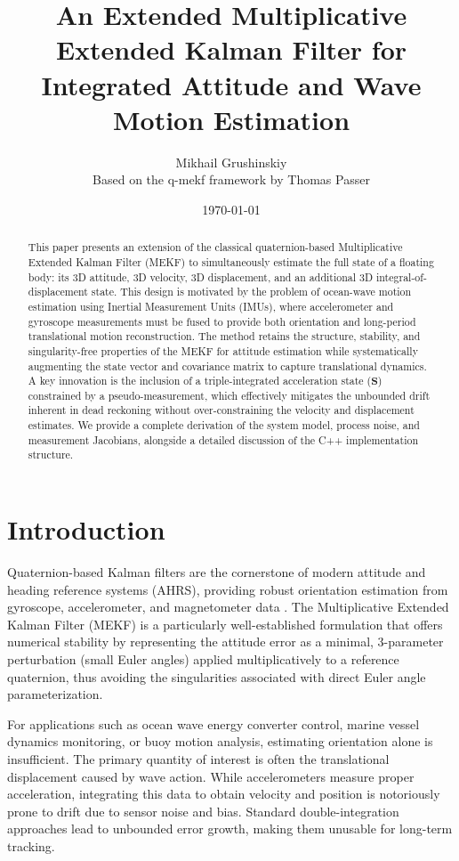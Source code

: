 \documentclass[11pt]{article}
\title{An Extended Multiplicative Extended Kalman Filter for Integrated Attitude and Wave Motion Estimation}
\author{Mikhail Grushinskiy \\ Based on the q-mekf framework by Thomas Passer}
\date{\today}
\begin{document}
\maketitle

\begin{abstract}
This paper presents an extension of the classical quaternion-based Multiplicative Extended Kalman Filter (MEKF) to simultaneously estimate the full state of a floating body: its 3D attitude, 3D velocity, 3D displacement, and an additional 3D integral-of-displacement state. This design is motivated by the problem of ocean-wave motion estimation using Inertial Measurement Units (IMUs), where accelerometer and gyroscope measurements must be fused to provide both orientation and long-period translational motion reconstruction. The method retains the structure, stability, and singularity-free properties of the MEKF for attitude estimation while systematically augmenting the state vector and covariance matrix to capture translational dynamics. A key innovation is the inclusion of a triple-integrated acceleration state ($\bm{S}$) constrained by a pseudo-measurement, which effectively mitigates the unbounded drift inherent in dead reckoning without over-constraining the velocity and displacement estimates. We provide a complete derivation of the system model, process noise, and measurement Jacobians, alongside a detailed discussion of the C++ implementation structure.
\end{abstract}

\section{Introduction}
\label{sec:introduction}
Quaternion-based Kalman filters are the cornerstone of modern attitude and heading reference systems (AHRS), providing robust orientation estimation from gyroscope, accelerometer, and magnetometer data \cite{crassidis2007survey, markley2003attitude}. The Multiplicative Extended Kalman Filter (MEKF) is a particularly well-established formulation that offers numerical stability by representing the attitude error as a minimal, 3-parameter perturbation (small Euler angles) applied multiplicatively to a reference quaternion, thus avoiding the singularities associated with direct Euler angle parameterization.

For applications such as ocean wave energy converter control, marine vessel dynamics monitoring, or buoy motion analysis, estimating orientation alone is insufficient. The primary quantity of interest is often the translational displacement caused by wave action. While accelerometers measure proper acceleration, integrating this data to obtain velocity and position is notoriously prone to drift due to sensor noise and bias. Standard double-integration approaches lead to unbounded error growth, making them unusable for long-term tracking.
\end{document}
